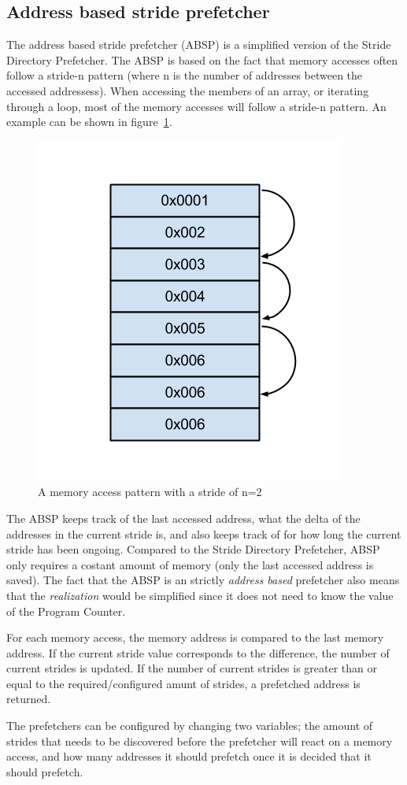 \subsection{Address based stride prefetcher}
\label{sec:stridePrefetcher}
The address based stride prefetcher (ABSP) is a simplified version of the Stride Directory Prefetcher. The ABSP is based on the fact that memory accesses
often follow a stride-n pattern (where n is the number of addresses between
the accessed addressess). When accessing the members of an
array, or iterating through a loop, most of the memory accesses will
follow a stride-n pattern. An example can be shown in figure~\ref{fig:stride}.

\begin{figure}[H]
\label{fig:stride}
\centerline{\includegraphics[scale=0.5]{./figures/stride}}
\caption{A memory access pattern with a stride of n=2}
\end{figure}

The ABSP keeps track of the last accessed address, what the delta of the addresses in the current stride is, and
also keeps track of for how long the current stride has been
ongoing. Compared to the Stride Directory Prefetcher, ABSP only requires a costant amount of memory (only the last accessed address is saved). The fact that the ABSP is an strictly \emph{address based} prefetcher also means that the \emph{realization} would be simplified since it does not need to know the value of the Program Counter.

For each memory access, the memory address is compared to the last
memory address. If the current stride value corresponds to the
difference, the number of current strides is updated. If the number of
current strides is greater than or equal to the required/configured
amunt of strides, a prefetched address is returned.  

The prefetchers can be configured by changing two variables;
the amount of strides that needs to be discovered before
the prefetcher will react on a memory access, and how many addresses it should prefetch once it is decided that it should prefetch.

